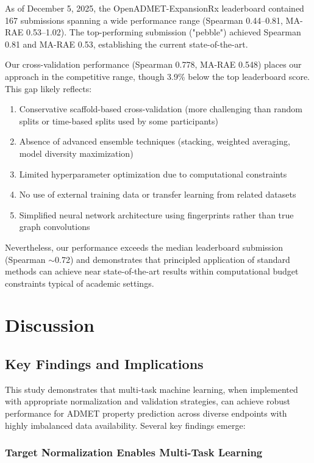 \documentclass[11pt,a4paper]{article}
\begin{document}
As of December 5, 2025, the OpenADMET-ExpansionRx leaderboard contained 167 submissions spanning a wide performance range (Spearman 0.44--0.81, MA-RAE 0.53--1.02). The top-performing submission ("pebble") achieved Spearman 0.81 and MA-RAE 0.53, establishing the current state-of-the-art.

Our cross-validation performance (Spearman 0.778, MA-RAE 0.548) places our approach in the competitive range, though 3.9\% below the top leaderboard score. This gap likely reflects:
\begin{enumerate}
    \item Conservative scaffold-based cross-validation (more challenging than random splits or time-based splits used by some participants)
    \item Absence of advanced ensemble techniques (stacking, weighted averaging, model diversity maximization)
    \item Limited hyperparameter optimization due to computational constraints
    \item No use of external training data or transfer learning from related datasets
    \item Simplified neural network architecture using fingerprints rather than true graph convolutions
\end{enumerate}

Nevertheless, our performance exceeds the median leaderboard submission (Spearman $\sim$0.72) and demonstrates that principled application of standard methods can achieve near state-of-the-art results within computational budget constraints typical of academic settings.

\section{Discussion}

\subsection{Key Findings and Implications}

This study demonstrates that multi-task machine learning, when implemented with appropriate normalization and validation strategies, can achieve robust performance for ADMET property prediction across diverse endpoints with highly imbalanced data availability. Several key findings emerge:

\subsubsection{Target Normalization Enables Multi-Task Learning}
\end{document}
